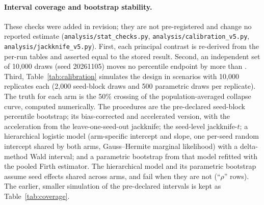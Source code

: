 \paragraph{Interval coverage and bootstrap stability.}
These checks were added in revision; they are not pre-registered and change no reported estimate
(\texttt{analysis/stat\_checks.py}, \texttt{analysis/calibration\_v5.py}, \texttt{analysis/jackknife\_v5.py}). First,
each principal contrast is re-derived from the per-run tables and asserted equal to the stored result. Second, an
independent set of 10,000 draws (seed 20261105) moves no percentile endpoint by more than \VrvMCShift{}. Third,
Table~\ref{tab:calibration} simulates the design in \VcalScen{} scenarios with 10,000 replicates each (2,000
seed-block draws and 500 parametric draws per replicate). The truth for each arm is the 50\% crossing of the
population-averaged collapse curve, computed numerically. The procedures are the pre-declared seed-block percentile
bootstrap; its bias-corrected and accelerated version, with the acceleration from the leave-one-seed-out jackknife;
the seed-level jackknife-$t$; a hierarchical logistic model (arm-specific intercept and slope, one per-seed random
intercept shared by both arms, Gauss--Hermite marginal likelihood) with a delta-method Wald interval; and a parametric
bootstrap from that model refitted with the pooled Firth estimator. The hierarchical model and its parametric
bootstrap assume seed effects shared across arms, and fail when they are not (``$\rho$'' rows). The earlier,
smaller simulation of the pre-declared intervals is kept as Table~\ref{tab:coverage}.


